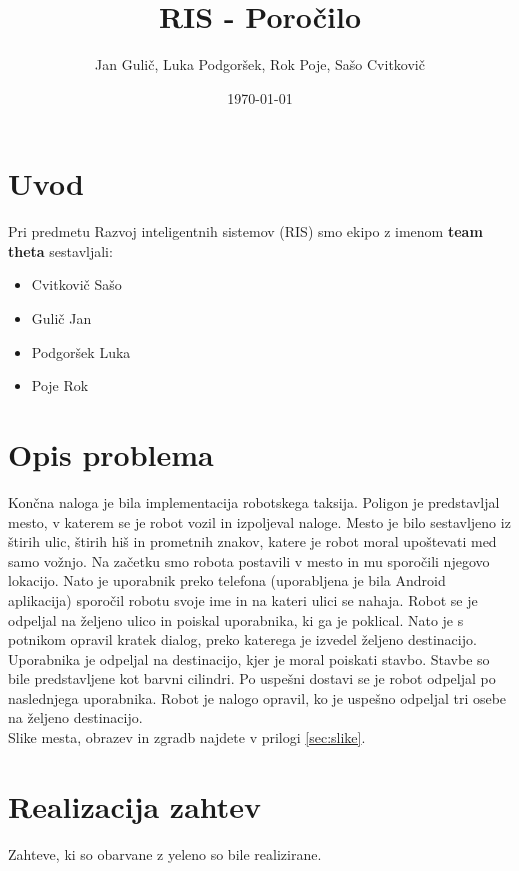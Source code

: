 \documentclass[a4paper,11pt]{article}
\title{RIS - Poročilo}
\author{Jan Gulič, Luka Podgoršek, Rok Poje, Sašo Cvitkovič}
\date{\today}
\begin{document}
\maketitle
\section{Uvod}

Pri predmetu Razvoj inteligentnih sistemov (RIS) smo ekipo z imenom \textbf{team theta} sestavljali:
\begin{itemize}
	\item Cvitkovič Sašo
	\item Gulič Jan
	\item Podgoršek Luka
	\item Poje Rok
\end{itemize}


\section{Opis problema}

Končna naloga je bila implementacija robotskega taksija. Poligon je predstavljal mesto, v katerem se je robot vozil in izpoljeval naloge. Mesto je bilo sestavljeno iz štirih ulic, štirih hiš in prometnih znakov, katere je robot moral upoštevati med samo vožnjo. Na začetku smo robota postavili v mesto in mu sporočili njegovo lokacijo. Nato je uporabnik preko telefona (uporabljena je bila Android aplikacija) sporočil robotu svoje ime in na kateri ulici se nahaja. Robot se je odpeljal na željeno ulico in poiskal uporabnika, ki ga je poklical. Nato je s potnikom opravil kratek dialog, preko katerega je izvedel željeno destinacijo. Uporabnika je odpeljal na destinacijo, kjer je moral poiskati stavbo. Stavbe so bile predstavljene kot barvni cilindri. Po uspešni dostavi se je robot odpeljal po naslednjega uporabnika. 
Robot je nalogo opravil, ko je uspešno odpeljal tri osebe na željeno destinacijo.\\


Slike mesta, obrazev in zgradb najdete v prilogi \ref{sec:slike}{}.

\pagebreak
\section{Realizacija zahtev}
Zahteve, ki so obarvane z yeleno so bile realizirane.
\end{document}
